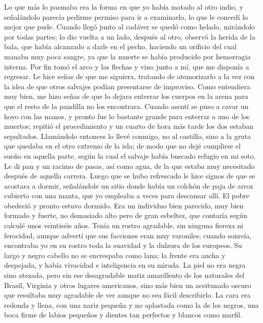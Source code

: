 \documentclass{novela}
\begin{document}
    Lo que más lo pasmaba era la forma en que yo había matado al otro indio, y señalándolo parecía pedirme permiso para ir a examinarlo, lo que le concedí lo mejor que pude. Cuando llegó junto al cadáver se quedó como helado, mirándolo por todas partes; lo dio vuelta a un lado, después al otro, observó la herida de la bala, que había alcanzado a darle en el pecho, haciendo un orificio del cual manaba muy poca sangre, ya que la muerte se había producido por hemorragia interna. Por fin tomó el arco y las flechas y vino junto a mí, que me disponía a regresar. Le hice señas de que me siguiera, tratando de atemorizarlo a la vez con la idea de que otros salvajes podían presentarse de improviso.
    Como entendiera muy bien, me hizo señas de que lo dejara enterrar los cuerpos en la arena para que el resto de la pandilla no los encontrara. Cuando asentí se puso a cavar un hoyo con las manos, y pronto fue lo bastante grande para enterrar a uno de los muertos; repitió el procedimiento y un cuarto de hora más tarde los dos estaban sepultados. Llamándolo entonces lo llevé conmigo, no al castillo, sino a la gruta que quedaba en el otro extremo de la isla; de modo que no dejé cumplirse el sueño en aquella parte, según la cual el salvaje había buscado refugio en mi soto.
    Le di pan y un racimo de pasas, así como agua, de la que estaba muy necesitado después de aquella carrera.
    Luego que se hubo refrescado le hice signos de que se acostara a dormir, señalándole un sitio donde había un colchón de paja de arroz cubierto con una manta, que yo empleaba a veces para descansar allí. El pobre obedeció y pronto estuvo dormido.
    Era un individuo bien parecido, muy bien formado y fuerte, no demasiado alto pero de gran esbeltez, que contaría según calculé unos veintiséis años. Tenía un rostro agradable, sin ninguna fiereza ni ferocidad, aunque advertí que sus facciones eran muy varoniles; cuando sonreía, encontraba yo en su rostro toda la suavidad y la dulzura de los europeos. Su largo y negro cabello no se encrespaba como lana; la frente era ancha y despejada, y había vivacidad e inteligencia en su mirada. La piel no era negra sino atezada, pero sin ese desagradable matiz amarillento de los naturales del Brasil, Virginia y otros lugares americanos, sino más bien un aceitunado oscuro que resultaba muy agradable de ver aunque no sea fácil describirlo. La cara era redonda y llena, con una nariz pequeña y no aplastada como la de los negros, una boca firme de labios pequeños y dientes tan perfectos y blancos como marfil.
\end{document}
